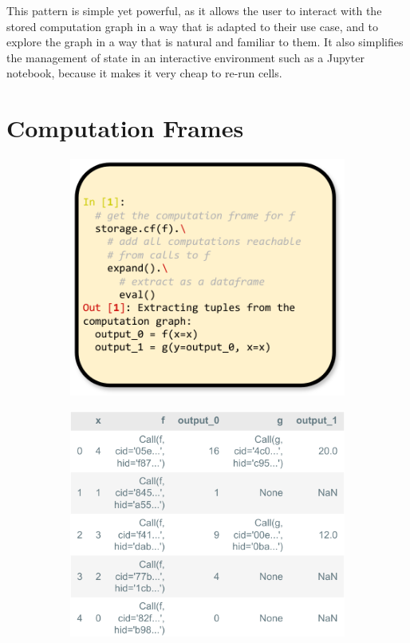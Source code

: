 \documentclass{article} %
\begin{document}
This pattern is simple yet powerful, as it allows the user to interact with the
stored computation graph in a way that is adapted to their use case, and to
explore the graph in a way that is natural and familiar to them. It also
simplifies the management of state in an interactive environment such as a
Jupyter notebook, because it makes it very cheap to re-run cells.


\section{Computation Frames}
\label{section:cf}

\begin{figure}[h]
\centering
\begin{subfigure}{0.47\textwidth}
\centering
\includegraphics[width=\textwidth]{img/fig4.pdf}
\end{subfigure}
\begin{subfigure}{0.47\textwidth}
\centering
\includegraphics[width=\textwidth]{img/fig5.pdf}

\end{subfigure}
\end{figure}
\end{document}
